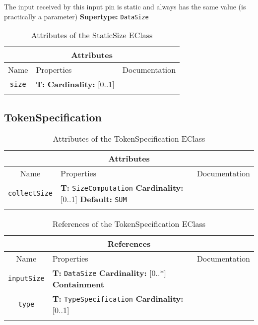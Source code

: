 \documentclass{article}
\begin{document}
The input received by this input pin is static and always has the same value (is practically a parameter)
\textbf{Supertype: }\texttt{DataSize}
\begin{table}[H]
\footnotesize
\begin{tabularx}{\textwidth}{|c| p{4 cm} | X |}
\hline
\multicolumn{3}{|c|}{\textbf{Attributes}} \\
\hline
Name & Properties & Documentation \\ \hline \hline
\texttt{size}
 & 
\textbf{T:} \texttt{}
\newline
\textbf{Cardinality:} [0..1]
 & \\ \hline
\caption{Attributes of the StaticSize EClass}
\end{tabularx}
\label{e4smStaticSizeattr}
\end{table}
\subsection[TokenSpecification]{TokenSpecification}
\label{e4smTokenSpecification}

\begin{table}[H]
\footnotesize
\begin{tabularx}{\textwidth}{|c| p{4 cm} | X |}
\hline
\multicolumn{3}{|c|}{\textbf{Attributes}} \\
\hline
Name & Properties & Documentation \\ \hline \hline
\texttt{collectSize}
 & 
\textbf{T:} \texttt{SizeComputation}
\newline
\textbf{Cardinality:} [0..1]
\newline
\textbf{Default:} \texttt{SUM}
 & \\ \hline
\caption{Attributes of the TokenSpecification EClass}
\end{tabularx}
\label{e4smTokenSpecificationattr}
\end{table}
\begin{table}[H]
\footnotesize
\begin{tabularx}{\textwidth}{|c| p{4 cm} | X |}
\hline
\multicolumn{3}{|c|}{\textbf{References}} \\
\hline
Name & Properties & Documentation \\ \hline \hline
\texttt{inputSize}
 & 
\textbf{T:} \texttt{DataSize}
\newline
\textbf{Cardinality:} [0..*]
\newline
\textbf{Containment}
 & \\ \hline
\texttt{type}
 & 
\textbf{T:} \texttt{TypeSpecification}
\newline
\textbf{Cardinality:} [0..1]
 & \\ \hline
\caption{References of the TokenSpecification EClass}
\end{tabularx}
\label{e4smTokenSpecificationref}
\end{table}
\end{document}
